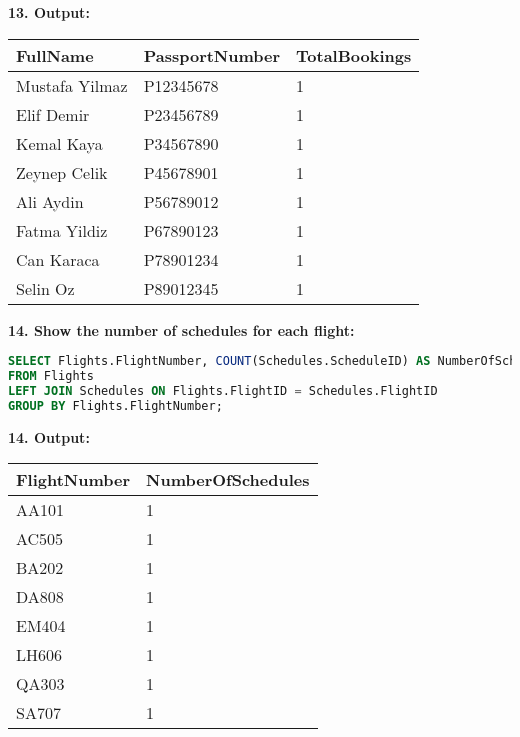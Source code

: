 \documentclass[14pt,a4paper]{extarticle}
\begin{document}
    \textbf{13. Output:}
\begin{table}[h!]
\centering
\begin{tabular}{|l|l|l|}
\hline
\textbf{FullName}       & \textbf{PassportNumber} & \textbf{TotalBookings} \\ \hline
Mustafa Yilmaz         & P12345678               & 1                     \\ \hline
Elif Demir             & P23456789               & 1                     \\ \hline
Kemal Kaya             & P34567890               & 1                     \\ \hline
Zeynep Celik           & P45678901               & 1                     \\ \hline
Ali Aydin              & P56789012               & 1                     \\ \hline
Fatma Yildiz           & P67890123               & 1                     \\ \hline
Can Karaca             & P78901234               & 1                     \\ \hline
Selin Oz               & P89012345               & 1                     \\ \hline
\end{tabular}
\end{table}

    \textbf{14. Show the number of schedules for each flight:}
    \begin{lstlisting}[language=SQL, upquote=true]
SELECT Flights.FlightNumber, COUNT(Schedules.ScheduleID) AS NumberOfSchedules
FROM Flights
LEFT JOIN Schedules ON Flights.FlightID = Schedules.FlightID
GROUP BY Flights.FlightNumber;
    \end{lstlisting}
    
    \textbf{14. Output:}
\begin{table}[h!]
\centering
\begin{tabular}{|l|l|}
\hline
\textbf{FlightNumber} & \textbf{NumberOfSchedules} \\ \hline
AA101                 & 1                         \\ \hline
AC505                 & 1                         \\ \hline
BA202                 & 1                         \\ \hline
DA808                 & 1                         \\ \hline
EM404                 & 1                         \\ \hline
LH606                 & 1                         \\ \hline
QA303                 & 1                         \\ \hline
SA707                 & 1                         \\ \hline
\end{tabular}
\end{table}
\end{document}
